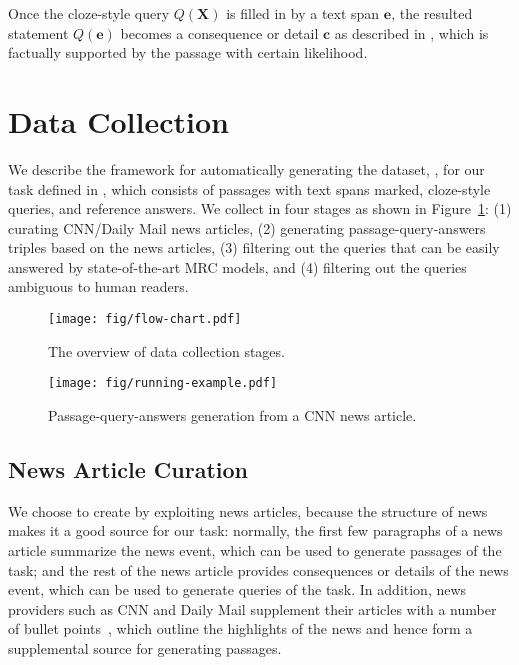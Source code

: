 Once the cloze-style query $Q(\mathbf{X})$ is filled in by a text span $\mathbf{e}$, the resulted statement $Q(\mathbf{e})$ becomes a consequence or detail $\mathbf{c}$ as described in , which is factually supported by the passage with certain likelihood.


\section{Data Collection}

We describe the framework for automatically generating the dataset, \ReCoRD, for our task defined in ,
which consists of passages with text spans marked, cloze-style queries, and reference answers.
We collect \ReCoRD in four stages as shown in Figure~\ref{fig:flow-chart}:
(1) curating CNN/Daily Mail news articles,
(2) generating passage-query-answers triples based on the news articles,
(3) filtering out the queries that can be easily answered by state-of-the-art MRC models,
and (4) filtering out the queries ambiguous to human readers.

\begin{figure}[!ht]
\centering
\texttt{[image: fig/flow-chart.pdf]}
\caption{The overview of data collection stages.\label{fig:flow-chart}}
\end{figure}

\begin{figure*}[!t]
\centering
\texttt{[image: fig/running-example.pdf]}
\caption{Passage-query-answers generation from a CNN news article.\label{fig:example-for-stage2}}
\end{figure*}

\subsection{News Article Curation}
\label{sec:news-curation}
We choose to create \ReCoRD by exploiting news articles, because the structure of news makes it a good source for our task:
normally, the first few paragraphs of a news article summarize the news event, which can be used to generate passages of the task;
and the rest of the news article provides consequences or details of the news event, which can be used to generate queries of the task.
In addition, news providers such as CNN and Daily Mail supplement their articles with a number of bullet points~\cite{Ranknet,story-highlight-generation,deepmind-cnn-dailymail}, which outline the highlights of the news and hence form a supplemental source for generating passages.

